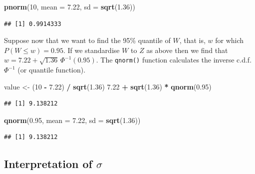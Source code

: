 \documentclass[
  british,
  11pt,
  openany, a4paper]{book}
\newenvironment{Shaded}{\begin{snugshade}}{\end{snugshade}}
\newcommand{\AttributeTok}[1]{\textcolor[rgb]{0.13,0.29,0.53}{#1}}
\newcommand{\DecValTok}[1]{\textcolor[rgb]{0.00,0.00,0.81}{#1}}
\newcommand{\FloatTok}[1]{\textcolor[rgb]{0.00,0.00,0.81}{#1}}
\newcommand{\FunctionTok}[1]{\textcolor[rgb]{0.13,0.29,0.53}{\textbf{#1}}}
\newcommand{\NormalTok}[1]{#1}
\newcommand{\OtherTok}[1]{\textcolor[rgb]{0.56,0.35,0.01}{#1}}
\newcommand{\SpecialCharTok}[1]{\textcolor[rgb]{0.81,0.36,0.00}{\textbf{#1}}}
\begin{document}
\begin{Shaded}
\begin{Highlighting}[]
\FunctionTok{pnorm}\NormalTok{(}\DecValTok{10}\NormalTok{, }\AttributeTok{mean =} \FloatTok{7.22}\NormalTok{, }\AttributeTok{sd =} \FunctionTok{sqrt}\NormalTok{(}\FloatTok{1.36}\NormalTok{))}
\end{Highlighting}
\end{Shaded}

\begin{verbatim}
## [1] 0.9914333
\end{verbatim}

Suppose now that we want to find the 95\% quantile of \(W\), that is, \(w\) for which \(P(W \leq w) = 0.95\). If we standardise \(W\) to \(Z\) as above then we find that \(w = 7.22 + \sqrt{1.36}\,\Phi^{-1}(0.95)\). The \texttt{qnorm()} function calculates the inverse c.d.f. \(\Phi^{-1}\) (or quantile function).

\begin{Shaded}
\begin{Highlighting}[]
\NormalTok{value }\OtherTok{\textless{}{-}}\NormalTok{ (}\DecValTok{10} \SpecialCharTok{{-}} \FloatTok{7.22}\NormalTok{) }\SpecialCharTok{/} \FunctionTok{sqrt}\NormalTok{(}\FloatTok{1.36}\NormalTok{)}
\FloatTok{7.22} \SpecialCharTok{+} \FunctionTok{sqrt}\NormalTok{(}\FloatTok{1.36}\NormalTok{) }\SpecialCharTok{*} \FunctionTok{qnorm}\NormalTok{(}\FloatTok{0.95}\NormalTok{)}
\end{Highlighting}
\end{Shaded}

\begin{verbatim}
## [1] 9.138212
\end{verbatim}

\begin{Shaded}
\begin{Highlighting}[]
\FunctionTok{qnorm}\NormalTok{(}\FloatTok{0.95}\NormalTok{, }\AttributeTok{mean =} \FloatTok{7.22}\NormalTok{, }\AttributeTok{sd =} \FunctionTok{sqrt}\NormalTok{(}\FloatTok{1.36}\NormalTok{))}
\end{Highlighting}
\end{Shaded}

\begin{verbatim}
## [1] 9.138212
\end{verbatim}

\subsection{\texorpdfstring{Interpretation of \(\sigma\)}{Interpretation of \textbackslash sigma}}\label{interpretation-of-sigma}
\end{document}
